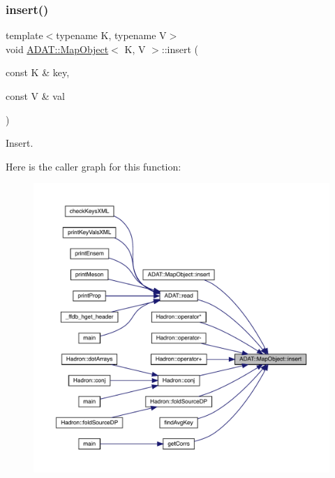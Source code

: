 \subsubsection{\texorpdfstring{insert()}{insert()}\hspace{0.1cm}{\footnotesize\ttfamily [1/9]}}
{\footnotesize\ttfamily template$<$typename K, typename V$>$ \\
void \mbox{\hyperlink{classADAT_1_1MapObject}{A\+D\+A\+T\+::\+Map\+Object}}$<$ K, V $>$\+::insert (\begin{DoxyParamCaption}\item[{const K \&}]{key,  }\item[{const V \&}]{val }\end{DoxyParamCaption})\hspace{0.3cm}{\ttfamily [inline]}}



Insert. 

Here is the caller graph for this function\+:
\nopagebreak
\begin{figure}[H]
\begin{center}
\leavevmode
\includegraphics[width=350pt]{da/d29/classADAT_1_1MapObject_a5389738841dca1228aefe6935c464a78_icgraph}
\end{center}
\end{figure}
\mbox{\label{classADAT_1_1MapObject_a5389738841dca1228aefe6935c464a78}} 
